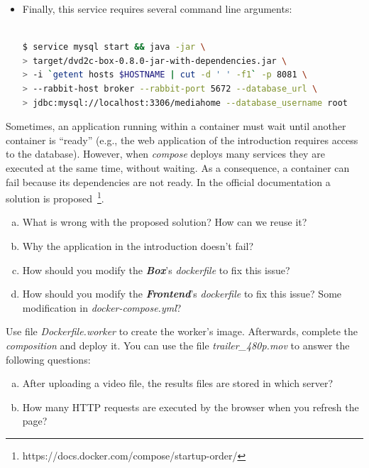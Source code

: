 \documentclass[a4paper,11pt]{exam}
\begin{document}
\begin{questions}
\begin{itemize}
		\item Finally, this service requires several command line arguments:

\begin{lstlisting}[frame=single,language={sh}] %
		
$ service mysql start && java -jar \
> target/dvd2c-box-0.8.0-jar-with-dependencies.jar \ 
> -i `getent hosts $HOSTNAME | cut -d ' ' -f1` -p 8081 \
> --rabbit-host broker --rabbit-port 5672 --database_url \
> jdbc:mysql://localhost:3306/mediahome --database_username root
\end{lstlisting}

	\end{itemize}
	
	\question Sometimes, an application running within a container must wait until another container is ``ready'' (e.g., the web application of the introduction requires access to the database). However, when \textit{compose} deploys many services they are executed at the same time, without waiting. As a consequence, a container can fail because its dependencies are not ready. In the official documentation a solution is proposed~\footnote{https://docs.docker.com/compose/startup-order/}.
	
		\begin{enumerate}[(a)] %
			\item What is wrong with the proposed solution? How can we reuse it?
			\item Why the application in the introduction doesn't fail?
			\item How should you modify the \textit{\textbf{Box}}'s \textit{dockerfile} to fix this issue?
			\item How should you modify the \textit{\textbf{Frontend}}'s \textit{dockerfile} to fix this issue? Some modification in \textit{docker-compose.yml}?
			
		\end{enumerate}
	
	\question Use file \textit{Dockerfile.worker} to create the worker's image. Afterwards, complete the \textit{composition} and deploy it. You can use the file \textit{trailer\_480p.mov} to answer the following questions:
	
	\begin{enumerate}[(a)] %
		\item After uploading a video file, the results files are stored in which server? 
		\item How many HTTP requests are executed by the browser when you refresh the page? 
	\end{enumerate}
	

\end{questions}
\end{document}
